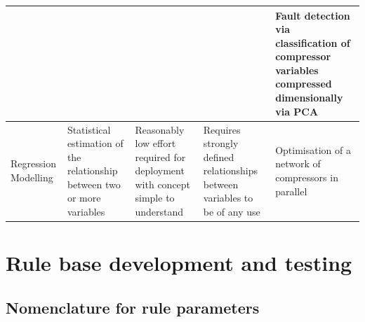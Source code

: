 \begin{center}
\begin{longtable}{p{}p{}p{}p{}p{}}
          &       &       &       & Fault detection via classification of compressor variables compressed dimensionally via PCA \cite{Liu2009}\\
    \midrule
    Regression Modelling & Statistical estimation of the relationship between two or more variables & Reasonably low effort required for deployment with concept simple to understand & Requires strongly defined relationships between variables to be of any use & Optimisation of a network of compressors in parallel \cite{Kopanos2015} \\ %
    \bottomrule
    \end{longtable}%
\end{center}
\twocolumn

\lipsum[1-10]

\section{Rule base development and testing}
\label{sec:rules}

\subsection{Nomenclature for rule parameters}
\label{subsec:nomenclature}

